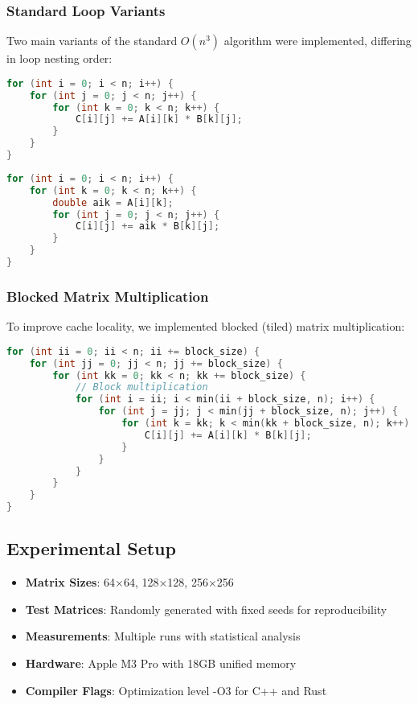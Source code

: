 \documentclass[11pt,a4paper]{article}
\begin{document}
\subsubsection{Standard Loop Variants}

Two main variants of the standard $O(n^3)$ algorithm were implemented, differing in loop nesting order:

\begin{lstlisting}[language=C++, caption=i-j-k Loop Order]
for (int i = 0; i < n; i++) {
    for (int j = 0; j < n; j++) {
        for (int k = 0; k < n; k++) {
            C[i][j] += A[i][k] * B[k][j];
        }
    }
}
\end{lstlisting}

\begin{lstlisting}[language=C++, caption=i-k-j Loop Order (Cache Optimized)]
for (int i = 0; i < n; i++) {
    for (int k = 0; k < n; k++) {
        double aik = A[i][k];
        for (int j = 0; j < n; j++) {
            C[i][j] += aik * B[k][j];
        }
    }
}
\end{lstlisting}

\subsubsection{Blocked Matrix Multiplication}

To improve cache locality, we implemented blocked (tiled) matrix multiplication:

\begin{lstlisting}[language=C++, caption=Blocked Matrix Multiplication]
for (int ii = 0; ii < n; ii += block_size) {
    for (int jj = 0; jj < n; jj += block_size) {
        for (int kk = 0; kk < n; kk += block_size) {
            // Block multiplication
            for (int i = ii; i < min(ii + block_size, n); i++) {
                for (int j = jj; j < min(jj + block_size, n); j++) {
                    for (int k = kk; k < min(kk + block_size, n); k++) {
                        C[i][j] += A[i][k] * B[k][j];
                    }
                }
            }
        }
    }
}
\end{lstlisting}

\subsection{Experimental Setup}

\begin{itemize}
    \item \textbf{Matrix Sizes}: 64×64, 128×128, 256×256
    \item \textbf{Test Matrices}: Randomly generated with fixed seeds for reproducibility
    \item \textbf{Measurements}: Multiple runs with statistical analysis
    \item \textbf{Hardware}: Apple M3 Pro with 18GB unified memory
    \item \textbf{Compiler Flags}: Optimization level -O3 for C++ and Rust
\end{itemize}
\end{document}
